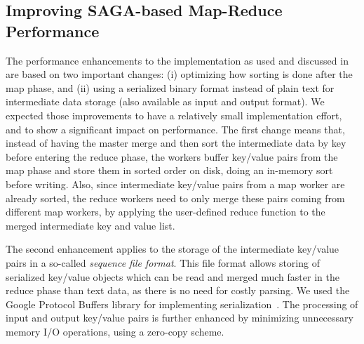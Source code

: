 \documentclass[3p,twocolumn]{elsarticle}
\begin{document}
\subsection{Improving SAGA-based Map-Reduce Performance}


The performance enhancements to the \sagamapreduce implementation as
used and discussed in~\cite{saga_ccgrid09} are based on two important
changes: (i) optimizing how sorting is done after the map phase,
and (ii) using a serialized binary format instead
of plain text for intermediate data storage (also available as
input and output format). We expected those improvements to have
a relatively small implementation effort, and to show a significant 
impact on performance.  The first change means that,
instead of having the master merge and then sort the intermediate data
by key before entering the reduce phase, the workers buffer key/value
pairs from the map phase and store them in sorted order on disk, doing
an in-memory sort before writing. Also, since intermediate key/value
pairs from a map worker are already sorted, the reduce workers need to
only merge these pairs coming from different map workers, by
applying the user-defined reduce function to the merged intermediate
key and value list. 

The second enhancement applies to the storage of
the intermediate key/value pairs in a so-called \emph{sequence file
  format}. This file format allows storing of serialized key/value
objects which can be read and merged much faster in the reduce phase
than text data, as there is no need for costly parsing.  We used the
Google Protocol Buffers library for implementing
serialization~\cite{protobuf}. The processing of input and output
key/value pairs is further enhanced by minimizing unnecessary memory
I/O operations, using a zero-copy scheme.

\end{document}
